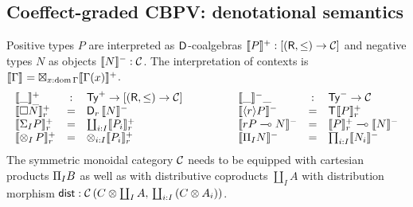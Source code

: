 \documentclass[acmsmall,review,anonymous]{acmart}\settopmatter{printfolios=true,printccs=false,printacmref=false}
\theoremstyle{remark}
\begin{document}


\subsection{Coeffect-graded CBPV: denotational semantics}



Positive types $P$ are interpreted as $\D$-coalgebras
$\denp P : [(\R,\leq) \to \CC]$ and negative types $N$ as objects
$\denn N : \CC$.
The interpretation of contexts is
$\den \Gamma = \boxtimes_{x:\dom\Gamma} \denp{\Gamma(x)}$.
\[
\begin{array}{lcl}
  \Denp\_\_ & : & \PTy \to [(\R,\leq) \to \CC] \\
  \Denp{\Box N}    r & = & \D[r]\, \denn N \\
  \Denp{\sumt I P} r & = & \coprod_{i:I} \Denp{P_i} r \\
  \Denp{\tupt I P} r & = & \otimes_{i:I} \Denp{P_i} r \\
\end{array}
\qquad\qquad
\begin{array}{lcl}
  \denn\_\_ & : & \NTy \to \CC \\
  \denn{\compty r P} & = & \T \Denp P r \\
  \denn{\qfun r P N} & = & \Denp P r \lolli \denn N \\
  \denn{\rect I N}   & = & \prod_{i:I} \denn{N_i} \\
\end{array}
\]
The symmetric monoidal category $\CC$ needs to be equipped with cartesian
products $\rect I B$ as well as with distributive coproducts
$\coprod_I A$ with distribution morphism
$\tdist : \Hom {C \otimes \coprod_I A} {\coprod_{i:I} {(C \otimes A_i)}}$.
\end{document}
